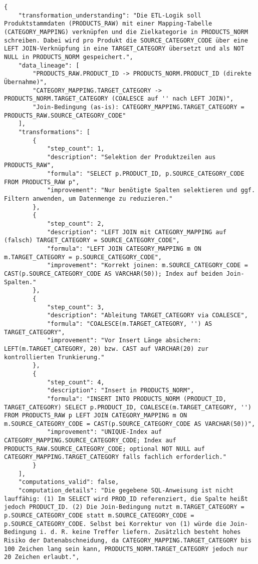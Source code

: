 \begin{lstlisting}[caption={Ausgabe: GPT-5 Anwendungsfall 6 Robustheitsdurchlauf},label={gpt_case6_prompt3}]
{
    "transformation_understanding": "Die ETL-Logik soll Produktstammdaten (PRODUCTS_RAW) mit einer Mapping-Tabelle (CATEGORY_MAPPING) verknüpfen und die Zielkategorie in PRODUCTS_NORM schreiben. Dabei wird pro Produkt die SOURCE_CATEGORY_CODE über eine LEFT JOIN-Verknüpfung in eine TARGET_CATEGORY übersetzt und als NOT NULL in PRODUCTS_NORM gespeichert.",
    "data_lineage": [
        "PRODUCTS_RAW.PRODUCT_ID -> PRODUCTS_NORM.PRODUCT_ID (direkte Übernahme)",
        "CATEGORY_MAPPING.TARGET_CATEGORY -> PRODUCTS_NORM.TARGET_CATEGORY (COALESCE auf '' nach LEFT JOIN)",
        "Join-Bedingung (as-is): CATEGORY_MAPPING.TARGET_CATEGORY = PRODUCTS_RAW.SOURCE_CATEGORY_CODE"
    ],
    "transformations": [
        {
            "step_count": 1,
            "description": "Selektion der Produktzeilen aus PRODUCTS_RAW",
            "formula": "SELECT p.PRODUCT_ID, p.SOURCE_CATEGORY_CODE FROM PRODUCTS_RAW p",
            "improvement": "Nur benötigte Spalten selektieren und ggf. Filtern anwenden, um Datenmenge zu reduzieren."
        },
        {
            "step_count": 2,
            "description": "LEFT JOIN mit CATEGORY_MAPPING auf (falsch) TARGET_CATEGORY = SOURCE_CATEGORY_CODE",
            "formula": "LEFT JOIN CATEGORY_MAPPING m ON m.TARGET_CATEGORY = p.SOURCE_CATEGORY_CODE",
            "improvement": "Korrekt joinen: m.SOURCE_CATEGORY_CODE = CAST(p.SOURCE_CATEGORY_CODE AS VARCHAR(50)); Index auf beiden Join-Spalten."
        },
        {
            "step_count": 3,
            "description": "Ableitung TARGET_CATEGORY via COALESCE",
            "formula": "COALESCE(m.TARGET_CATEGORY, '') AS TARGET_CATEGORY",
            "improvement": "Vor Insert Länge absichern: LEFT(m.TARGET_CATEGORY, 20) bzw. CAST auf VARCHAR(20) zur kontrollierten Trunkierung."
        },
        {
            "step_count": 4,
            "description": "Insert in PRODUCTS_NORM",
            "formula": "INSERT INTO PRODUCTS_NORM (PRODUCT_ID, TARGET_CATEGORY) SELECT p.PRODUCT_ID, COALESCE(m.TARGET_CATEGORY, '') FROM PRODUCTS_RAW p LEFT JOIN CATEGORY_MAPPING m ON m.SOURCE_CATEGORY_CODE = CAST(p.SOURCE_CATEGORY_CODE AS VARCHAR(50))",
            "improvement": "UNIQUE-Index auf CATEGORY_MAPPING.SOURCE_CATEGORY_CODE; Index auf PRODUCTS_RAW.SOURCE_CATEGORY_CODE; optional NOT NULL auf CATEGORY_MAPPING.TARGET_CATEGORY falls fachlich erforderlich."
        }
    ],
    "computations_valid": false,
    "computation_details": "Die gegebene SQL-Anweisung ist nicht lauffähig: (1) Im SELECT wird PROD_ID referenziert, die Spalte heißt jedoch PRODUCT_ID. (2) Die Join-Bedingung nutzt m.TARGET_CATEGORY = p.SOURCE_CATEGORY_CODE statt m.SOURCE_CATEGORY_CODE = p.SOURCE_CATEGORY_CODE. Selbst bei Korrektur von (1) würde die Join-Bedingung i. d. R. keine Treffer liefern. Zusätzlich besteht hohes Risiko der Datenabschneidung, da CATEGORY_MAPPING.TARGET_CATEGORY bis 100 Zeichen lang sein kann, PRODUCTS_NORM.TARGET_CATEGORY jedoch nur 20 Zeichen erlaubt.",

\end{lstlisting}
